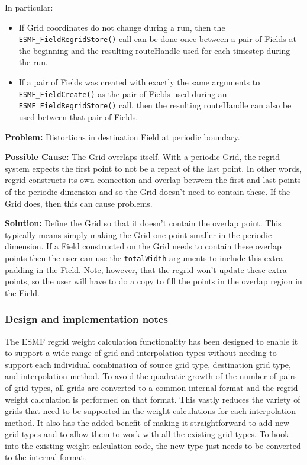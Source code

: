  \smallskip

 In particular:
 \begin{itemize}

 \item If Grid coordinates do not change during a run, then the {\tt ESMF\_FieldRegridStore()} call can be
 done once between a pair of Fields at the beginning and the resulting routeHandle used for each 
 timestep during the run. 

 \item If a pair of Fields was created with exactly the same arguments to {\tt ESMF\_FieldCreate()} as the 
 pair of Fields used during an {\tt ESMF\_FieldRegridStore()} call, then the resulting routeHandle can 
 also be used between that pair of Fields. 
 \end{itemize}

 \bigskip
 
 {\bf Problem:} Distortions in destination Field at periodic boundary.

 \medskip

 {\bf Possible Cause:} The Grid overlaps itself. With a periodic Grid, the regrid system expects
  the first point to not be a repeat of the last point. In other words,
  regrid constructs its own connection and overlap between the first and last points of the
  periodic dimension and so the Grid doesn't need to contain these. If the Grid does, then this
  can cause problems. 

 \smallskip

 {\bf Solution:} Define the Grid so that it doesn't contain the overlap point. This typically means simply making
 the Grid one point smaller in the periodic dimension.  If a Field 
 constructed on the Grid needs to contain these overlap points then the user can use the
 {\tt totalWidth} arguments to include this extra padding in the Field. Note, however, 
 that the regrid won't update these extra points, so the user will have to do a copy to fill the points
 in the overlap region in the Field.  

\subsubsection{Design and implementation notes}

The ESMF regrid weight calculation functionality has been designed to enable it to support a wide range
of grid and interpolation types without needing to support each individual combination of source grid type,
destination grid type, and interpolation method. To avoid the quadratic growth of the number of pairs
of grid types, all grids are converted to a common internal format and the regrid weight calculation
is performed on that format. This vastly reduces the variety of grids that need to be supported in 
the weight calculations for each interpolation method. It also has the added benefit of making it
straightforward to add new grid types and to allow them to work with all the existing grid types.
To hook into the existing weight calculation code, the new type just needs to be converted to the
internal format. 

